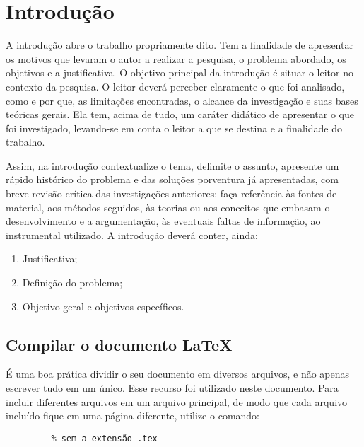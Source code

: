 
\chapter{Introdução}
\label{c_introducao}

A introdução abre o trabalho propriamente dito. Tem a finalidade de apresentar os motivos que levaram o autor a realizar a pesquisa, o problema abordado, os objetivos e a justificativa. O objetivo principal da introdução é situar o leitor no contexto da pesquisa. O leitor deverá perceber claramente o que foi analisado, como e por que, as limitações encontradas, o alcance da investigação e suas bases teóricas gerais. Ela tem, acima de tudo, um caráter didático de apresentar o que foi investigado, levando-se em conta o leitor a que se destina e a finalidade do trabalho.

Assim, na introdução contextualize o tema, delimite o assunto, apresente um rápido histórico do problema e das soluções porventura já apresentadas, com breve revisão crítica das investigações anteriores; faça referência às fontes de material, aos métodos seguidos, às teorias ou aos conceitos que embasam o desenvolvimento e a argumentação, às eventuais faltas de informação, ao instrumental utilizado. A introdução deverá conter, ainda:

\begin{enumerate}
   \item Justificativa;
   \item Definição do problema;
   \item Objetivo geral e objetivos específicos.
\end{enumerate}


\section{Compilar o documento \LaTeX}

É uma boa prática dividir o seu documento em diversos arquivos, e não apenas escrever tudo em um único. Esse recurso foi utilizado neste documento. Para incluir diferentes arquivos em um arquivo principal, de modo que cada arquivo incluído fique em uma página diferente, utilize o comando:

\begin{verbatim}
         % sem a extensão .tex
\end{verbatim}

